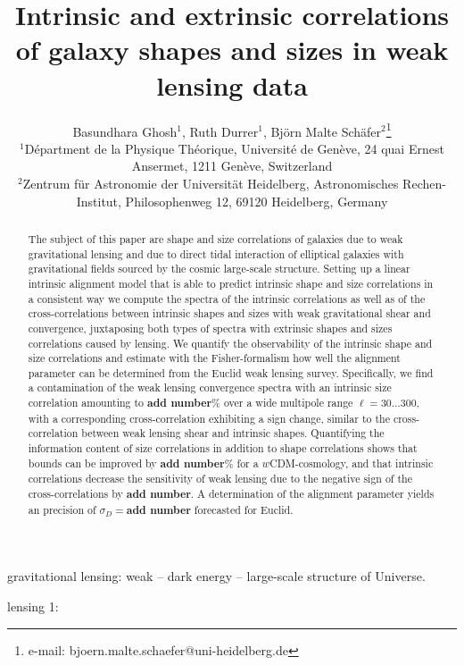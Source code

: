 \documentclass[a4paper,fleqn,usenatbib]{mnras}
\title[Intrinsic sizes and shapes of galaxies]
{Intrinsic and extrinsic correlations of galaxy shapes and sizes in weak lensing data}
\author[B. Ghosh, R. Durrer, B.M. Sch{\"a}fer]
{Basundhara Ghosh$^1$, Ruth Durrer$^1$, Bj{\"o}rn Malte Sch{\"a}fer$^2$\thanks{e-mail: bjoern.malte.schaefer@uni-heidelberg.de}\\
$^1$D{\'e}partment de la Physique Th{\'e}orique, Universit{\'e} de Gen{\`e}ve, 24 quai Ernest Ansermet, 1211 Gen{\`e}ve, Switzerland\\
$^2$Zentrum f{\"u}r Astronomie der Universit{\"a}t Heidelberg, Astronomisches Rechen-Institut, Philosophenweg 12, 69120 Heidelberg, Germany
}
\def\spirou#1{{\bf #1}}
\begin{document}
\pagerange{\pageref{firstpage}--\pageref{lastpage}}
\maketitle
\label{firstpage}


\begin{abstract}
The subject of this paper are shape and size correlations of galaxies due to weak gravitational lensing and due to direct tidal interaction of elliptical galaxies with gravitational fields sourced by the cosmic large-scale structure. Setting up a linear intrinsic alignment model that is able to predict intrinsic shape and size correlations in a consistent way we compute the spectra of the intrinsic correlations as well as of the cross-correlations between intrinsic shapes and sizes with weak gravitational shear and convergence, juxtaposing both types of spectra with extrinsic shapes and sizes correlations caused by lensing. We quantify the observability of the intrinsic shape and size correlations and estimate with the Fisher-formalism how well the alignment parameter can be determined from the Euclid weak lensing survey. Specifically, we find a contamination of the weak lensing convergence spectra with an intrinsic size correlation amounting to \spirou{add number}\% over a wide multipole range $\ell=30\ldots300$, with a corresponding cross-correlation exhibiting a sign change, similar to the cross-correlation between weak lensing shear and intrinsic shapes. Quantifying the information content of size correlations in addition to shape correlations shows that bounds can be improved by \spirou{add number}\% for a $w$CDM-cosmology, and that intrinsic correlations decrease the sensitivity of weak lensing due to the negative sign of the cross-correlations by \spirou{add number}. A determination of the alignment parameter yields an precision of $\sigma_D=$\spirou{add number} forecasted for Euclid.
\end{abstract}


\begin{keywords}
gravitational lensing: weak -- dark energy -- large-scale structure of Universe.
\end{keywords}


lensing 1: \citep{ayaita_investigating_2012,bartelmann_gravitational_2010,bartelmann_weak_2001,bate_when_2019,bernardeau_full-sky_2010,bernstein_comprehensive_2009,bernstein_dark_2004,bernstein_shapes_2002,blazek_beyond_2017,blazek_separating_2012,brainerd_weak_1996,capranico_intrinsic_2013,casarini_non-linear_2011,casarini_tomographic_2012,catelan_intrinsic_2001,chang_dark_2017,cooray_power_2001,cooray_weak_2001,cooray_weak_2002,crittenden_spin-induced_2001,de_jong_kilo-degree_2013,dodelson_weak_2005,dossett_figures_2011,douspis_tension_2019,grandis_information_2016,grassi_detecting_2014,heavens_3d_2003,heavens_combining_2013,heavens_intrinsic_2000,heavens_measuring_2006,heymans_cfhtlens_2013,heymans_weak_2003,hilbert_cosmic_2011,hirata_cross-correlation_2004,hollenstein_constraints_2009,hu_dark_2001,hu_dark_2002,hu_power_1999,hu_power_2001,hu_weak_1999,huff_magnificent_2011}
\end{document}
